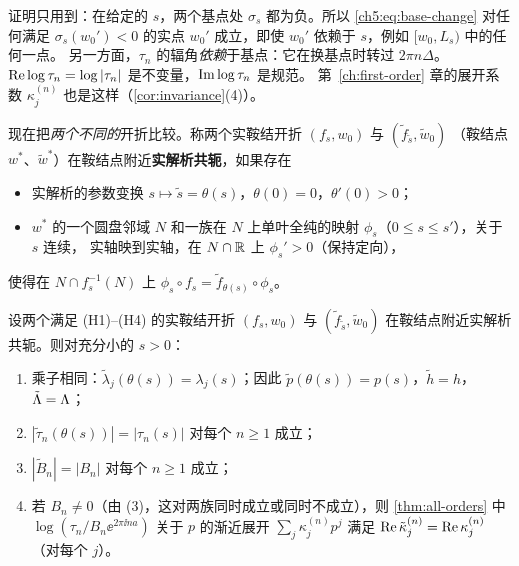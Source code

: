 \begin{remark}\label{ch5:rem:base-point-pointwise}
证明只用到：在给定的 $s$，两个基点处 $\sigma_s$ 都为负。所以 \eqref{ch5:eq:base-change} 对任何满足
$\sigma_s(w_0')<0$ 的实点 $w_0'$ 成立，即使 $w_0'$ 依赖于 $s$，例如 $[w_0,L_s)$ 中的任何一点。
另一方面，$\tau_n$ 的辐角\emph{依赖}于基点：它在换基点时转过 $2\pi n\Delta$。
$\operatorname{Re}\log\tau_n=\log|\tau_n|$ 是不变量，$\operatorname{Im}\log\tau_n$ 是规范。
第~\ref{ch:first-order} 章的展开系数 $\kappa^{(n)}_j$ 也是这样（\cref{cor:invariance}(4)）。
\end{remark}

现在把\emph{两个不同的}开折比较。称两个实鞍结开折 $(f_s,w_0)$ 与 $(\tilde f_{\tilde s},\tilde w_0)$
（鞍结点 $w^*$、$\tilde w^*$）在鞍结点附近\textbf{实解析共轭}，如果存在
\begin{itemize}
\item 实解析的参数变换 $s\mapsto\tilde s=\theta(s)$，$\theta(0)=0$，$\theta'(0)>0$；
\item $w^*$ 的一个圆盘邻域 $N$ 和一族在 $N$ 上单叶全纯的映射 $\phi_s$（$0\le s\le s'$），关于 $s$ 连续，
  实轴映到实轴，在 $N\cap\mathbb{R}$ 上 $\phi_s'>0$（保持定向），
\end{itemize}
使得在 $N\cap f_s^{-1}(N)$ 上 $\phi_s\circ f_s=\tilde f_{\theta(s)}\circ\phi_s$。

\begin{corollary}[不变性]\label{cor:invariance}
设两个满足 (H1)--(H4) 的实鞍结开折 $(f_s,w_0)$ 与 $(\tilde f_{\tilde s},\tilde w_0)$ 在鞍结点附近实解析共轭。则对充分小的 $s>0$：
\begin{enumerate}
\item 乘子相同：$\tilde\lambda_j(\theta(s))=\lambda_j(s)$；因此 $\tilde p(\theta(s))=p(s)$，$\tilde h=h$，$\tilde{\Lambda}=\Lambda$；
\item $|\tilde\tau_n(\theta(s))|=|\tau_n(s)|$ 对每个 $n\ge1$ 成立；
\item $|\tilde B_n|=|B_n|$ 对每个 $n\ge1$ 成立；
\item 若 $B_n\ne0$（由 (3)，这对两族同时成立或同时不成立），则 \cref{thm:all-orders} 中 $\log(\tau_n/B_n\ee^{2\pi\ii na})$ 关于 $p$ 的渐近展开
  $\sum_j\kappa^{(n)}_jp^j$ 满足 $\operatorname{Re}\tilde\kappa^{(n)}_j=\operatorname{Re}\kappa^{(n)}_j$（对每个 $j$）。
\end{enumerate}
\end{corollary}

